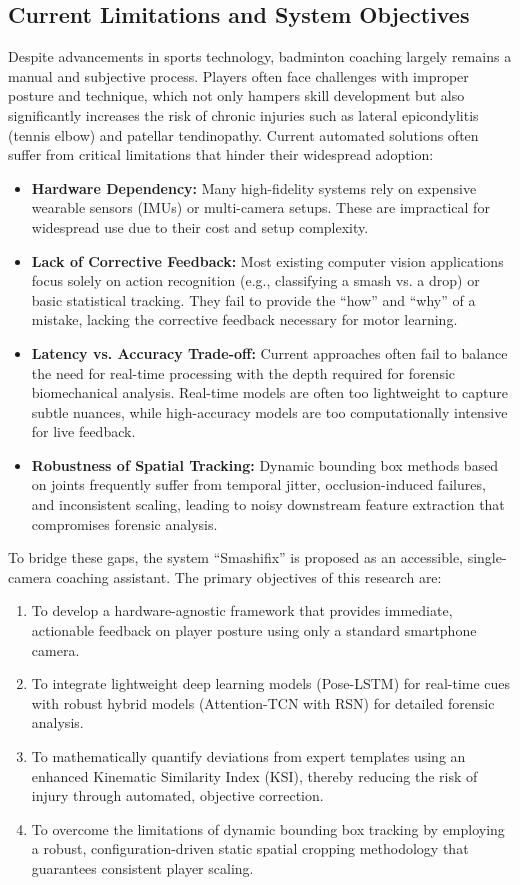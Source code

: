 \documentclass[pdflatex,sn-mathphys-num]{sn-jnl}%
\theoremstyle{thmstyleone}%
\theoremstyle{thmstyletwo}%
\theoremstyle{thmstylethree}%
\begin{document}
\subsection{Current Limitations and System Objectives}
Despite advancements in sports technology, badminton coaching largely remains a manual and subjective process. Players often face challenges with improper posture and technique, which not only hampers skill development but also significantly increases the risk of chronic injuries such as lateral epicondylitis (tennis elbow) and patellar tendinopathy. Current automated solutions often suffer from critical limitations that hinder their widespread adoption:
\begin{itemize}
    \item \textbf{Hardware Dependency:} Many high-fidelity systems rely on expensive wearable sensors (IMUs) or multi-camera setups. These are impractical for widespread use due to their cost and setup complexity.
    \item \textbf{Lack of Corrective Feedback:} Most existing computer vision applications focus solely on action recognition (e.g., classifying a smash vs. a drop) or basic statistical tracking. They fail to provide the ``how'' and ``why'' of a mistake, lacking the corrective feedback necessary for motor learning.
    \item \textbf{Latency vs. Accuracy Trade-off:} Current approaches often fail to balance the need for real-time processing with the depth required for forensic biomechanical analysis. Real-time models are often too lightweight to capture subtle nuances, while high-accuracy models are too computationally intensive for live feedback.
    \item \textbf{Robustness of Spatial Tracking:} Dynamic bounding box methods based on joints frequently suffer from temporal jitter, occlusion-induced failures, and inconsistent scaling, leading to noisy downstream feature extraction that compromises forensic analysis.
\end{itemize}

To bridge these gaps, the system ``Smashifix'' is proposed as an accessible, single-camera coaching assistant. The primary objectives of this research are:
\begin{enumerate}
    \item To develop a hardware-agnostic framework that provides immediate, actionable feedback on player posture using only a standard smartphone camera.
    \item To integrate lightweight deep learning models (Pose-LSTM) for real-time cues with robust hybrid models (Attention-TCN with RSN) for detailed forensic analysis.
    \item To mathematically quantify deviations from expert templates using an enhanced Kinematic Similarity Index (KSI), thereby reducing the risk of injury through automated, objective correction.
    \item To overcome the limitations of dynamic bounding box tracking by employing a robust, configuration-driven static spatial cropping methodology that guarantees consistent player scaling.
\end{enumerate}
\end{document}
